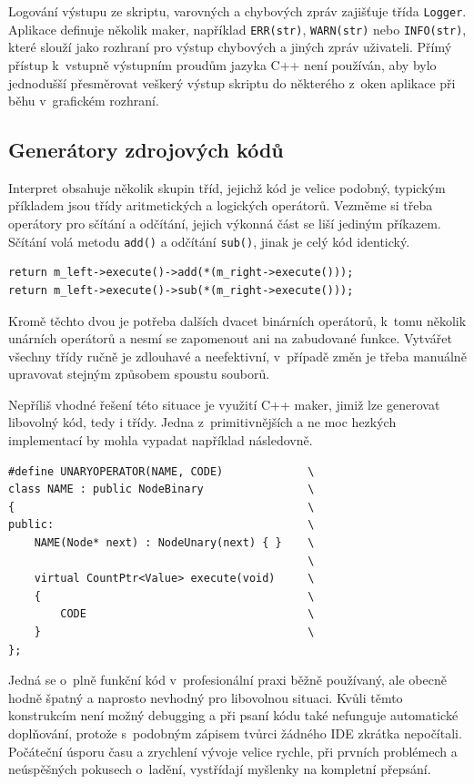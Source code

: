 \documentclass[11pt,twoside,a4paper]{book}
\begin{document}
Logování výstupu ze skriptu, varovných a chybových zpráv zajišťuje třída \texttt{Logger}. Aplikace definuje několik maker, například \texttt{ERR(str)}, \texttt{WARN(str)} nebo \texttt{INFO(str)}, které slouží jako rozhraní pro výstup chybových a jiných zpráv uživateli. Přímý přístup k~vstupně výstupním proudům jazyka C++ není používán, aby bylo jednodušší přesměrovat veškerý výstup skriptu do některého z~oken aplikace při běhu v~grafickém rozhraní.


\subsection{Generátory zdrojových kódů}

Interpret obsahuje několik skupin tříd, jejichž kód je velice podobný, typickým příkladem jsou třídy aritmetických a logických operátorů. Vezměme si třeba operátory pro sčítání a odčítání, jejich výkonná část se liší jediným příkazem. Sčítání volá metodu \texttt{add()} a odčítání \texttt{sub()}, jinak je celý kód identický.

\begin{verbatim}
return m_left->execute()->add(*(m_right->execute()));
return m_left->execute()->sub(*(m_right->execute()));
\end{verbatim}

Kromě těchto dvou je potřeba dalších dvacet binárních operátorů, k~tomu několik unárních operátorů a nesmí se zapomenout ani na zabudované funkce. Vytvářet všechny třídy ručně je zdlouhavé a neefektivní, v~případě změn je třeba manuálně upravovat stejným způsobem spoustu souborů.

Nepříliš vhodné řešení této situace je využití C++ maker, jimiž lze generovat libovolný kód, tedy i třídy. Jedna z~primitivnějších a ne moc hezkých implementací by mohla vypadat například následovně.

\begin{verbatim}
#define UNARYOPERATOR(NAME, CODE)             \
class NAME : public NodeBinary                \
{                                             \
public:                                       \
    NAME(Node* next) : NodeUnary(next) { }    \
                                              \
    virtual CountPtr<Value> execute(void)     \
    {                                         \
        CODE                                  \
    }                                         \
};
\end{verbatim}

Jedná se o~plně funkční kód v~profesionální praxi běžně používaný, ale obecně hodně špatný a naprosto nevhodný pro libovolnou situaci. Kvůli těmto konstrukcím není možný debugging a při psaní kódu také nefunguje automatické do\-pl\-ňo\-vá\-ní, protože s~podobným zápisem tvůrci žádného IDE zkrátka nepočítali. Počáteční úsporu času a zrychlení vývoje velice rychle, při prvních problémech a neúspěšných pokusech o~ladění, vystřídají myšlenky na kompletní přepsání.
\end{document}
